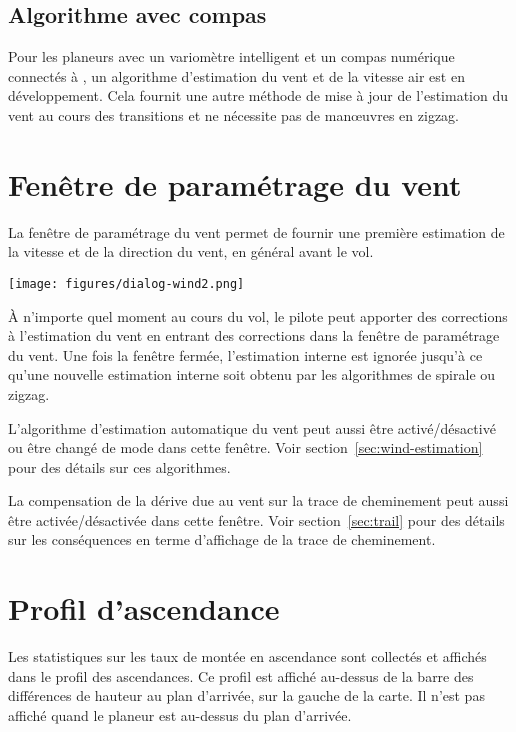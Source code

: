 \subsection*{Algorithme avec compas}

Pour les planeurs avec un variomètre intelligent et un compas numérique connectés à \xc, un algorithme d'estimation du vent et de la vitesse air est en développement.
Cela fournit une autre méthode de mise à jour de l'estimation du vent au cours des transitions et ne nécessite pas de manœuvres en zigzag.

\section{Fenêtre de paramétrage du vent}\label{sec:wind-setup}

La fenêtre de paramétrage du vent permet de fournir une première estimation de la vitesse et de la direction du vent, en général avant le vol.

\begin{center}
\texttt{[image: figures/dialog-wind2.png]}
\end{center}

À n'importe quel moment au cours du vol, le pilote peut apporter des corrections à l'estimation du vent en entrant des corrections dans la fenêtre de paramétrage du vent.
Une fois la fenêtre fermée, l'estimation interne est ignorée jusqu'à ce qu'une nouvelle estimation interne soit obtenu par les algorithmes de spirale ou zigzag.

L'algorithme d'estimation automatique du vent peut aussi être activé/désactivé ou être changé de mode dans cette fenêtre.
Voir section~\ref{sec:wind-estimation} pour des détails sur ces algorithmes.

La compensation de la dérive due au vent sur la trace de cheminement peut aussi être activée/désactivée dans cette fenêtre.
Voir section~\ref{sec:trail} pour des détails sur les conséquences en terme d'affichage de la trace de cheminement.

\section{Profil d'ascendance}

Les statistiques sur les taux de montée en ascendance sont collectés et affichés dans le profil des ascendances.
Ce profil est affiché au-dessus de la barre des différences de hauteur au plan d'arrivée, sur la gauche de la carte.
Il n'est pas affiché quand le planeur est au-dessus du plan d'arrivée.

